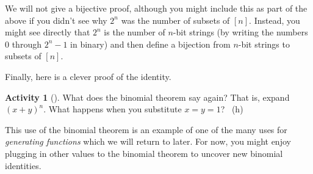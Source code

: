 \documentclass[10pt,]{book}
\theoremstyle{plain}
\theoremstyle{definition}
\theoremstyle{definition}
\theoremstyle{definition}
\newtheorem{activity}[project]{Activity}
\numberwithin{equation}{chapter}
\begin{document}
We will not give a bijective proof, although you might include this as part of the above if you didn't see why \(2^n\) was the number of subsets of \([n]\).  Instead, you might see directly that \(2^n\) is the number of \(n\)-bit strings (by writing the numbers 0 through \(2^n - 1\) in binary) and then define a bijection from \(n\)-bit strings to subsets of \([n]\).%
\par
\hypertarget{p-586}{}%
Finally, here is a clever proof of the identity.%
\begin{activity}[]\label{act-pascalrowsum-binom}
\hypertarget{p-587}{}%
What does the binomial theorem say again?  That is, expand \((x+y)^n\).  What happens when you substitute \(x = y = 1\)?%
~{\tiny (h)}\end{activity}
\hypertarget{p-589}{}%
This use of the binomial theorem is an example of one of the many uses for \emph{generating functions} which we will return to later.  For now, you might enjoy plugging in other values to the binomial theorem to uncover new binomial identities.%
\typeout{************************************************}
\typeout{************************************************}
\end{document}
